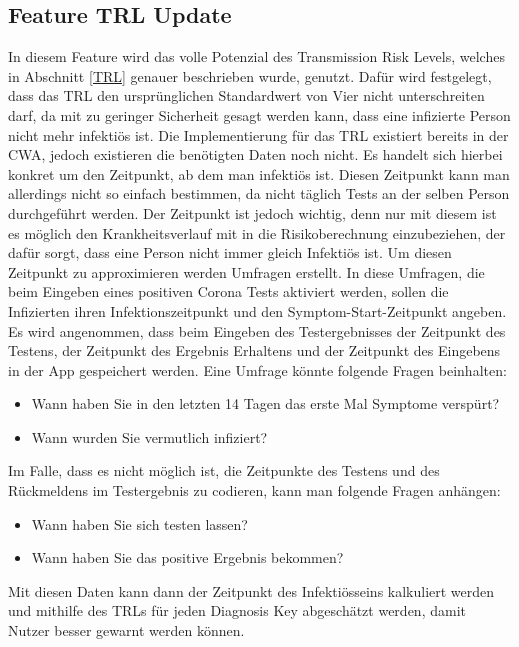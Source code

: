 \documentclass[conference,compsoc]{IEEEtran}
\begin{document}
\subsection{Feature TRL Update}
\label{Feature TRL Update}
In diesem Feature wird das volle Potenzial des Transmission Risk Levels, welches in Abschnitt \ref{TRL} genauer beschrieben wurde, genutzt. 
Dafür wird festgelegt, dass das TRL den ursprünglichen Standardwert von Vier nicht unterschreiten darf,
da mit zu geringer Sicherheit gesagt werden kann, dass eine infizierte Person nicht mehr infektiös ist. 
Die Implementierung für das TRL existiert bereits in der CWA, jedoch existieren die benötigten Daten noch nicht.
Es handelt sich hierbei konkret um den Zeitpunkt, ab dem man infektiös ist. 
Diesen Zeitpunkt kann man allerdings nicht so einfach bestimmen, da nicht täglich Tests an der selben Person durchgeführt werden.
Der Zeitpunkt ist jedoch wichtig, denn nur mit diesem ist es möglich den Krankheitsverlauf mit in die Risikoberechnung einzubeziehen,
der dafür sorgt, dass eine Person nicht immer gleich Infektiös ist. 
Um diesen Zeitpunkt zu approximieren werden Umfragen erstellt.  
In diese Umfragen, die beim Eingeben eines positiven Corona Tests aktiviert werden, sollen die Infizierten ihren Infektionszeitpunkt und den Symptom-Start-Zeitpunkt angeben. 
Es wird angenommen, dass beim Eingeben des Testergebnisses der Zeitpunkt des Testens, 
der Zeitpunkt des Ergebnis Erhaltens und der Zeitpunkt des Eingebens in der App gespeichert werden. 
Eine Umfrage könnte folgende Fragen beinhalten:

\begin{itemize}
	\item Wann haben Sie in den letzten 14 Tagen das erste Mal Symptome verspürt?
	\item Wann wurden Sie vermutlich infiziert?
\end{itemize}

Im Falle, dass es nicht möglich ist, die Zeitpunkte des Testens und des Rückmeldens im Testergebnis zu codieren, kann man folgende Fragen anhängen:

\begin{itemize}
	\item Wann haben Sie sich testen lassen?
	\item Wann haben Sie das positive Ergebnis bekommen?
\end{itemize} 
	
Mit diesen Daten kann dann der Zeitpunkt des Infektiösseins kalkuliert werden und mithilfe des TRLs für jeden Diagnosis Key abgeschätzt werden,
damit Nutzer besser gewarnt werden können.
\end{document}
